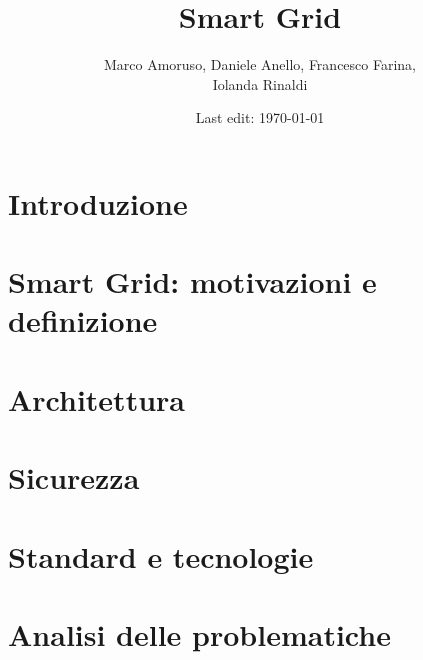 \documentclass[11pt,oneside]{book}
\title{Smart Grid} %
\author{Marco Amoruso, Daniele Anello, Francesco Farina, \\Iolanda Rinaldi } %
\date{Last edit: \today} %
\newcommand{\initial}[1]{ %
\lettrine[lines=3,lhang=0.3,nindent=0em]{
\color{DarkGoldenrod}
{\textsf{#1}}}{}}
\begin{document}
\maketitle %

\thispagestyle{fancy} %



\tableofcontents
\chapter{Introduzione}

\chapter{Smart Grid: motivazioni e definizione}

\chapter{Architettura}

\chapter{Sicurezza}

\chapter{Standard e tecnologie}

\chapter{Analisi delle problematiche}

\end{document}
